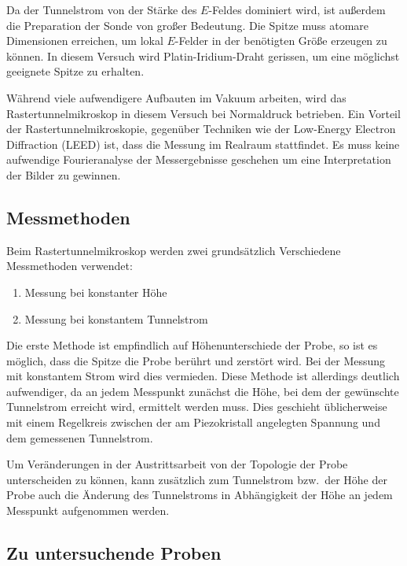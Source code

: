 Da der Tunnelstrom von der Stärke des $E$-Feldes dominiert wird,
ist außerdem die Preparation der Sonde von großer Bedeutung.
Die Spitze muss atomare Dimensionen erreichen, um lokal $E$-Felder in der benötigten Größe erzeugen zu können.
In diesem Versuch wird Platin-Iridium-Draht gerissen, um eine möglichst geeignete Spitze zu erhalten.

Während viele aufwendigere Aufbauten im Vakuum arbeiten, wird das Rastertunnelmikroskop in diesem Versuch bei Normaldruck betrieben.
Ein Vorteil der Rastertunnelmikroskopie, gegenüber Techniken wie der Low-Energy Electron Diffraction (LEED) ist, dass die Messung im Realraum stattfindet.
Es muss keine aufwendige Fourieranalyse der Messergebnisse geschehen um eine Interpretation der Bilder zu gewinnen.


\subsection{Messmethoden}

Beim Rastertunnelmikroskop werden zwei grundsätzlich Verschiedene Messmethoden verwendet:
\begin{enumerate}
  \item Messung bei konstanter Höhe
  \item Messung bei konstantem Tunnelstrom
\end{enumerate}

Die erste Methode ist empfindlich auf Höhenunterschiede der Probe, so ist es möglich, dass die Spitze die Probe berührt und zerstört wird.
Bei der Messung mit konstantem Strom wird dies vermieden.
Diese Methode ist allerdings deutlich aufwendiger, da an jedem Messpunkt zunächst die Höhe, bei dem der gewünschte Tunnelstrom erreicht wird, ermittelt werden muss.
Dies geschieht üblicherweise mit einem Regelkreis zwischen der am Piezokristall angelegten Spannung und dem gemessenen Tunnelstrom.

Um Veränderungen in der Austrittsarbeit von der Topologie der Probe unterscheiden zu können, kann zusätzlich zum Tunnelstrom bzw.\ der Höhe der Probe auch die Änderung des Tunnelstroms in Abhängigkeit der Höhe an jedem Messpunkt aufgenommen werden.

\subsection{Zu untersuchende Proben}

